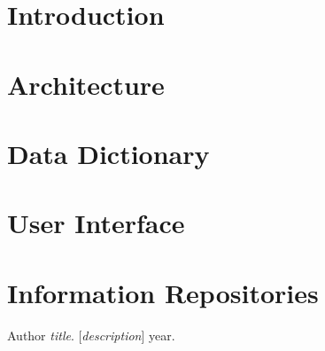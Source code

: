 \documentclass{article}
\title{}
\author{}
\date{}
\begin{document}



\tableofcontents
\listoffigures
\newpage

\begin{versionhistory}
\end{versionhistory}
\newpage

\section{Introduction}

\section{Architecture}

\section{Data Dictionary}

\section{User Interface}

\section{Information Repositories}

\newpage
\begin{thebibliography}{1}
\bibitem{}
Author
\textit{title}.
[\textit{description}] year.
\end{thebibliography}

\end{document}
